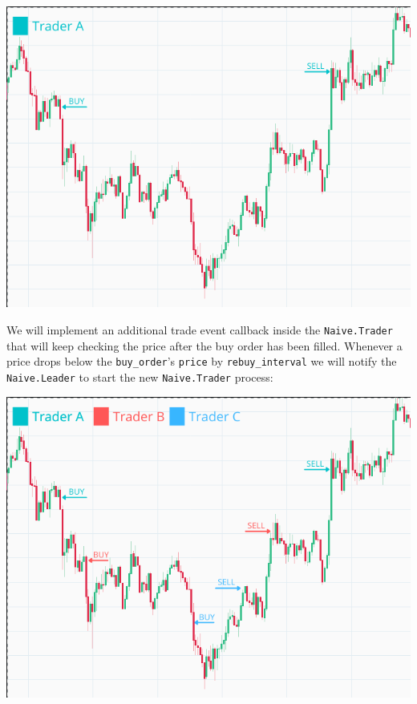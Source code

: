 \documentclass[
  oneside]{book}
\begin{document}
\begin{center}\includegraphics[height=0.2\textheight]{images/chapter_09_01_single_trader} \end{center}

We will implement an additional trade event callback inside the \texttt{Naive.Trader} that will keep checking the price after the buy order has been filled. Whenever a price drops below the \texttt{buy\_order}'s \texttt{price} by \texttt{rebuy\_interval} we will notify the \texttt{Naive.Leader} to start the new \texttt{Naive.Trader} process:

\begin{center}\includegraphics[height=0.2\textheight]{images/chapter_09_02_multi_traders} \end{center}
\end{document}
